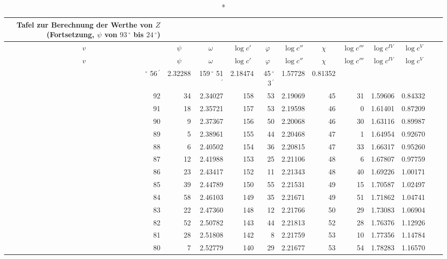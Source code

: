 \documentclass[12pt,a4paper]{article}
\newcommand{\Grad}{\,^\circ}
\newcommand{\Min}{\,^\prime}
\begin{document}
\begin{small}
\noindent\begin{longtable}{@{}rr|rr|rr|rr|rr|rr@{}}
\caption*{Tafel zur Berechnung der Werthe von $Z$ (Fortsetzung, $\psi$ von $93\Grad$ bis $24\Grad$)}\\
\toprule
\multicolumn{1}{c}{$v$} & \multicolumn{1}{c}{$\psi$} &
\multicolumn{1}{c}{$\omega$} & \multicolumn{1}{c}{$\log c'$} &
\multicolumn{1}{c}{$\varphi$} & \multicolumn{1}{c}{$\log c''$} &
\multicolumn{1}{c}{$\chi$} & \multicolumn{1}{c}{$\log c'''$} &
\multicolumn{1}{c}{$\log c^{IV}$} & \multicolumn{1}{c}{$\log c^{V}$} \\
\midrule
\endfirsthead
\toprule
\multicolumn{1}{c}{$v$} & \multicolumn{1}{c}{$\psi$} &
\multicolumn{1}{c}{$\omega$} & \multicolumn{1}{c}{$\log c'$} &
\multicolumn{1}{c}{$\varphi$} & \multicolumn{1}{c}{$\log c''$} &
\multicolumn{1}{c}{$\chi$} & \multicolumn{1}{c}{$\log c'''$} &
\multicolumn{1}{c}{$\log c^{IV}$} & \multicolumn{1}{c}{$\log c^{V}$} \\
\midrule
\endhead
\bottomrule
\endfoot
93$\Grad$ 56$\Min$ & 2.32288 & 159$\Grad$ 51$\Min$ & 2.18474 & 45$\Grad$ 3$\Min$ & 1.57728 & 0.81352 \\
92 & 34 & 2.34027 & 158 & 53 & 2.19069 & 45 & 31 & 1.59606 & 0.84332 \\
91 & 18 & 2.35721 & 157 & 53 & 2.19598 & 46 & 0 & 1.61401 & 0.87209 \\
90 & 9 & 2.37367 & 156 & 50 & 2.20068 & 46 & 30 & 1.63116 & 0.89987 \\
89 & 5 & 2.38961 & 155 & 44 & 2.20468 & 47 & 1 & 1.64954 & 0.92670 \\
88 & 6 & 2.40502 & 154 & 36 & 2.20815 & 47 & 33 & 1.66317 & 0.95260 \\
87 & 12 & 2.41988 & 153 & 25 & 2.21106 & 48 & 6 & 1.67807 & 0.97759 \\
86 & 23 & 2.43417 & 152 & 11 & 2.21343 & 48 & 40 & 1.69226 & 1.00171 \\
85 & 39 & 2.44789 & 150 & 55 & 2.21531 & 49 & 15 & 1.70587 & 1.02497 \\
84 & 58 & 2.46103 & 149 & 35 & 2.21671 & 49 & 51 & 1.71862 & 1.04741 \\
83 & 22 & 2.47360 & 148 & 12 & 2.21766 & 50 & 29 & 1.73083 & 1.06904 \\
82 & 52 & 2.50782 & 143 & 44 & 2.21813 & 52 & 28 & 1.76376 & 1.12926 \\
81 & 28 & 2.51808 & 142 & 8 & 2.21759 & 53 & 10 & 1.77356 & 1.14784 \\
80 & 7 & 2.52779 & 140 & 29 & 2.21677 & 53 & 54 & 1.78283 & 1.16570 \\

\end{longtable}
\end{small}
\end{document}

